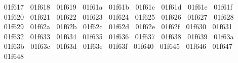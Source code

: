 {  ^^^^^^01f617%
  ^^^^^^01f618%
  ^^^^^^01f619%
  ^^^^^^01f61a%
  ^^^^^^01f61b%
  ^^^^^^01f61c%
  ^^^^^^01f61d%
  ^^^^^^01f61e%
  ^^^^^^01f61f%
  ^^^^^^01f620%
  ^^^^^^01f621%
  ^^^^^^01f622%
  ^^^^^^01f623%
  ^^^^^^01f624%
  ^^^^^^01f625%
  ^^^^^^01f626%
  ^^^^^^01f627%
  ^^^^^^01f628%
  ^^^^^^01f629%
  ^^^^^^01f62a%
  ^^^^^^01f62b%
  ^^^^^^01f62c%
  ^^^^^^01f62d%
  ^^^^^^01f62e%
  ^^^^^^01f62f%
  ^^^^^^01f630%
  ^^^^^^01f631%
  ^^^^^^01f632%
  ^^^^^^01f633%
  ^^^^^^01f634%
  ^^^^^^01f635%
  ^^^^^^01f636%
  ^^^^^^01f637%
  ^^^^^^01f638%
  ^^^^^^01f639%
  ^^^^^^01f63a%
  ^^^^^^01f63b%
  ^^^^^^01f63c%
  ^^^^^^01f63d%
  ^^^^^^01f63e%
  ^^^^^^01f63f%
  ^^^^^^01f640%
  ^^^^^^01f645%
  ^^^^^^01f646%
  ^^^^^^01f647%
  ^^^^^^01f648%
}
